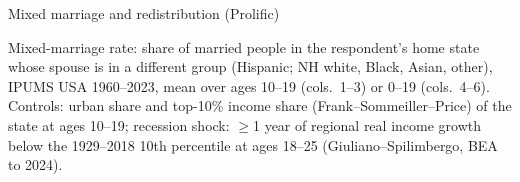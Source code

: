 \documentclass[aspectratio=169]{beamer}
\begin{document}
%
%

\begin{frame}{Mixed marriage and redistribution (Prolific)}

\begin{table}
    \centering
    \scalebox{0.79}{\parbox{\linewidth}{\centering\tiny\setlength{\tabcolsep}{4pt}\renewcommand{\arraystretch}{0.72}
    }}
\end{table}
\vspace{-0.6em}
{\tiny Mixed-marriage rate: share of married people in the respondent's home state whose spouse is in a different group (Hispanic; NH white, Black, Asian, other), IPUMS USA 1960--2023, mean over ages 10--19 (cols.\ 1--3) or 0--19 (cols.\ 4--6). Controls: urban share and top-10\% income share (Frank--Sommeiller--Price) of the state at ages 10--19; recession shock: $\geq$1 year of regional real income growth below the 1929--2018 10th percentile at ages 18--25 (Giuliano--Spilimbergo, BEA to 2024).\par}

\end{frame}
\end{document}
